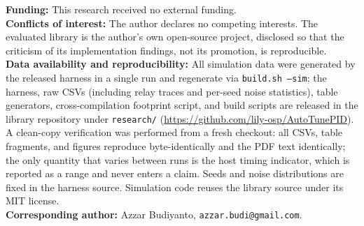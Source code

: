 \documentclass[10pt,twocolumn]{article}
\begin{document}
\textbf{Funding:} This research received no external funding.\\
\textbf{Conflicts of interest:} The author declares no competing interests. The evaluated library is the author's own open-source project, disclosed so that the criticism of its implementation findings, not its promotion, is reproducible.\\
\textbf{Data availability and reproducibility:} All simulation data were generated by the released harness in a single run and regenerate via \texttt{build.sh --sim}; the harness, raw CSVs (including relay traces and per-seed noise statistics), table generators, cross-compilation footprint script, and build scripts are released in the library repository under \texttt{research/} (\url{https://github.com/lily-osp/AutoTunePID}). A clean-copy verification was performed from a fresh checkout: all CSVs, table fragments, and figures reproduce byte-identically and the PDF text identically; the only quantity that varies between runs is the host timing indicator, which is reported as a range and never enters a claim. Seeds and noise distributions are fixed in the harness source. Simulation code reuses the library source under its MIT license.\\
\textbf{Corresponding author:} Azzar Budiyanto, \texttt{azzar.budi@gmail.com}.



\end{document}
